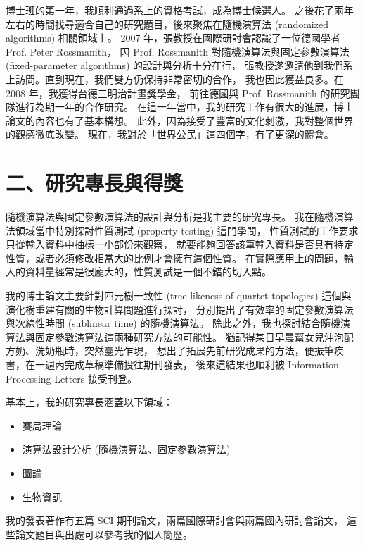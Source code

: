 \documentclass[10pt,a4paper]{article}
\begin{document}
博士班的第一年，我順利通過系上的資格考試，成為博士候選人。
之後花了兩年左右的時間找尋適合自己的研究題目，後來聚焦在隨機演算法 
(randomized algorithms) 相關領域上。
2007 年，張教授在國際研討會認識了一位德國學者 Prof. Peter Rossmanith， 
因 Prof. Rossmanith 對隨機演算法與固定參數演算法 
(fixed-parameter algorithms) 的設計與分析十分在行，
張教授遂邀請他到我們系上訪問。直到現在，我們雙方仍保持非常密切的合作，
我也因此獲益良多。在 2008 年，我獲得台德三明治計畫獎學金，
前往德國與 Prof. Rossmanith 的研究團隊進行為期一年的合作研究。
在這一年當中，我的研究工作有很大的進展，博士論文的內容也有了基本構想。
此外，因為接受了豐富的文化刺激，我對整個世界的觀感徹底改變。
現在，我對於「世界公民」這四個字，有了更深的體會。



\section*{\bf\large 二、研究專長與得獎}
\label{sec:personal-background}


隨機演算法與固定參數演算法的設計與分析是我主要的研究專長。
我在隨機演算法領域當中特別探討性質測試 (property testing) 這門學問，
性質測試的工作要求只從輸入資料中抽樣一小部份來觀察，
就要能夠回答該筆輸入資料是否具有特定性質，或者必須修改相當大的比例才會擁有這個性質。
在實際應用上的問題，輸入的資料量經常是很龐大的，性質測試是一個不錯的切入點。


我的博士論文主要針對四元樹一致性 (tree-likeness of quartet topologies) 
這個與演化樹重建有關的生物計算問題進行探討，
分別提出了有效率的固定參數演算法與次線性時間 (sublinear time) 的隨機演算法。
除此之外，我也探討結合隨機演算法與固定參數演算法這兩種研究方法的可能性。
猶記得某日早晨幫女兒沖泡配方奶、洗奶瓶時，突然靈光乍現，
想出了拓展先前研究成果的方法，便振筆疾書，在一週內完成草稿準備投往期刊發表，
後來這結果也順利被 Information Processing Letters 接受刊登。


基本上，我的研究專長涵蓋以下領域：
\begin{itemize}
\item 賽局理論
\vspace{-3pt}
\item 演算法設計分析 (隨機演算法、固定參數演算法)
\vspace{-3pt}
\item 圖論
\vspace{-3pt}
\item 生物資訊
\end{itemize}
我的發表著作有五篇 SCI 期刊論文，兩篇國際研討會與兩篇國內研討會論文，
這些論文題目與出處可以參考我的個人簡歷。
\end{document}
